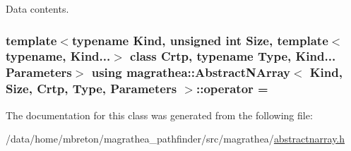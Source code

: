 Data contents. 

\hypertarget{classmagrathea_1_1AbstractNArray_ab941e2df51c9f6fe2d16cfc9a8178df9}{
\subsubsection[{operator}]{\setlength{\rightskip}{0pt plus 5cm}template$<$typename Kind, unsigned int Size, template$<$ typename, Kind...$>$ class Crtp, typename Type, Kind... Parameters$>$ using {\bf magrathea\-::\-Abstract\-N\-Array}$<$ Kind, Size, Crtp, Type, Parameters $>$\-::operator = }}\label{classmagrathea_1_1AbstractNArray_ab941e2df51c9f6fe2d16cfc9a8178df9}


The documentation for this class was generated from the following file\-:\begin{DoxyCompactItemize}
\item 
/data/home/mbreton/magrathea\-\_\-pathfinder/src/magrathea/\hyperlink{abstractnarray_8h}{abstractnarray.\-h}\end{DoxyCompactItemize}
